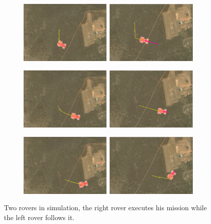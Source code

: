 \begin{figure}[ht!]
\begin{subfigure}[b]{0.8\columnwidth}
  \end{subfigure}
  \begin{subfigure}[b]{0.8\columnwidth}
    \includegraphics[width=\textwidth]{img/follow5.png}
  \end{subfigure}
  \begin{subfigure}[b]{0.8\columnwidth}
    \includegraphics[width=\textwidth]{img/follow6.png}
  \end{subfigure}
  \begin{subfigure}[b]{0.8\columnwidth}
    \includegraphics[width=\textwidth]{img/follow7.png}
  \end{subfigure}

  \caption{Two rovers in simulation, the right rover executes his mission while the left rover follows it.}
  \label{fig:simulation}
\end{figure}

